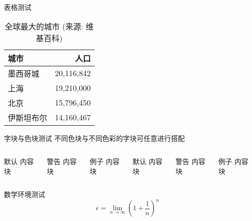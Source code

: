 \documentclass[10pt]{beamer}
\begin{document}
\begin{frame}{表格测试}
  \begin{table}
    \caption{全球最大的城市 (来源: 维基百科)}
    \begin{tabular}{@{} lr @{}}
      \toprule
      城市 & 人口\\
      \midrule
      墨西哥城 & 20,116,842\\
      上海 & 19,210,000\\
      北京 & 15,796,450\\
      伊斯坦布尔 & 14,160,467\\
      \bottomrule
    \end{tabular}
  \end{table}
\end{frame}
\begin{frame}{字块与色块测试}
  不同色块与不同色彩的字块可任意进行搭配

  \begin{columns}[T,onlytextwidth]
      \begin{block}{默认}
        内容块
      \end{block}

      \begin{alertblock}{警告}
        内容块
      \end{alertblock}

      \begin{exampleblock}{例子}
        内容块
      \end{exampleblock}



      \begin{block}{默认}
        内容块
      \end{block}

      \begin{alertblock}{警告}
        内容块
      \end{alertblock}

      \begin{exampleblock}{例子}
        内容块
      \end{exampleblock}

  \end{columns}
\end{frame}
\begin{frame}{数学环境测试}
  \begin{equation*}
    e = \lim_{n\to \infty} \left(1 + \frac{1}{n}\right)^n
  \end{equation*}
\end{frame}
\end{document}
